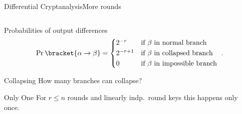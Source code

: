 \begin{frame}{Differential Cryptanalysis}{More rounds}
\begin{columns}
\begin{column}{0.49\textwidth}
\begin{block}{Probabilities of output differences}
                \begin{equation*}
                    \Prob\bracket{\alpha \to \beta} = \begin{cases*}
                        2^{-r}   & if $\beta$ in normal branch\\
                        2^{-r+1} & if $\beta$ in collapsed branch\\
                        0        & if $\beta$ in impossible branch
                    \end{cases*}.
                \end{equation*}
            \end{block}
            \begin{alertblock}{Collapsing}
                How many branches can collapse?
            \end{alertblock}
            \begin{exampleblock}{Only One}
                For $r \leqslant n$ rounds and linearly indp.\ round keys this happens only once.
            \end{exampleblock}
        \end{column}
    \end{columns}
\end{frame}

